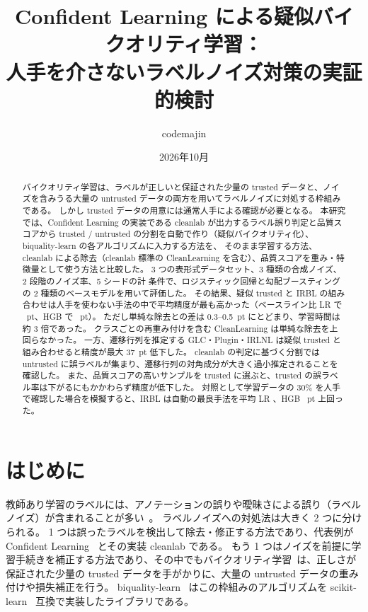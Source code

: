 \documentclass[a4paper,10pt]{ltjsarticle}
\title{Confident Learning による疑似バイクオリティ学習：\\人手を介さないラベルノイズ対策の実証的検討}
\author{codemajin}
\date{2026年10月}
\newcommand{\cl}{\textsf{cleanlab}}
\newcommand{\bq}{\textsf{biquality-learn}}
\begin{document}
\maketitle

\begin{abstract}
バイクオリティ学習は、ラベルが正しいと保証された少量の trusted データと、ノイズを含みうる大量の untrusted データの両方を用いてラベルノイズに対処する枠組みである。
しかし trusted データの用意には通常人手による確認が必要となる。
本研究では、Confident Learning の実装である \cl{} が出力するラベル誤り判定と品質スコアから trusted / untrusted の分割を自動で作り（疑似バイクオリティ化）、\bq{} の各アルゴリズムに入力する方法を、
そのまま学習する方法、\cl{} による除去（\cl{} 標準の CleanLearning を含む）、品質スコアを重み・特徴量として使う方法と比較した。
3 つの表形式データセット、3 種類の合成ノイズ、2 段階のノイズ率、5 シードの計 \NCond{} 条件で、ロジスティック回帰と勾配ブースティングの 2 種類のベースモデルを用いて評価した。
その結果、疑似 trusted と IRBL の組み合わせは人手を使わない手法の中で平均精度が最も高かった（ベースライン比 LR で \DLRNaiveIRBL{}~pt、HGB で \DHGBNaiveIRBL{}~pt）。
ただし単純な除去との差は 0.3--0.5~pt にとどまり、学習時間は約 3 倍であった。
クラスごとの再重み付けを含む CleanLearning は単純な除去を上回らなかった。
一方、遷移行列を推定する GLC・Plugin・IRLNL は疑似 trusted と組み合わせると精度が最大 37~pt 低下した。
\cl{} の判定に基づく分割では untrusted に誤ラベルが集まり、遷移行列の対角成分が大きく過小推定されることを確認した。
また、品質スコアの高いサンプルを trusted に選ぶと、trusted の誤ラベル率は下がるにもかかわらず精度が低下した。
対照として学習データの 30\% を人手で確認した場合を模擬すると、IRBL は自動の最良手法を平均 LR \PLROracleThirtyVsNaiveIrbl{}、HGB \PHGBOracleThirtyVsNaiveIrbl{}~pt 上回った。
\end{abstract}

\section{はじめに}

教師あり学習のラベルには、アノテーションの誤りや曖昧さによる誤り（ラベルノイズ）が含まれることが多い~\cite{frenay2014survey,song2023survey}。
ラベルノイズへの対処法は大きく 2 つに分けられる。
1 つは誤ったラベルを検出して除去・修正する方法であり、代表例が Confident Learning~\cite{northcutt2021confident} とその実装 \cl{} である。
もう 1 つはノイズを前提に学習手続きを補正する方法であり、その中でもバイクオリティ学習~\cite{nodet2023framework}は、正しさが保証された少量の trusted データを手がかりに、大量の untrusted データの重み付けや損失補正を行う。
\bq{}~\cite{nodet2023bqlearn} はこの枠組みのアルゴリズムを scikit-learn~\cite{pedregosa2011sklearn} 互換で実装したライブラリである。
\end{document}
